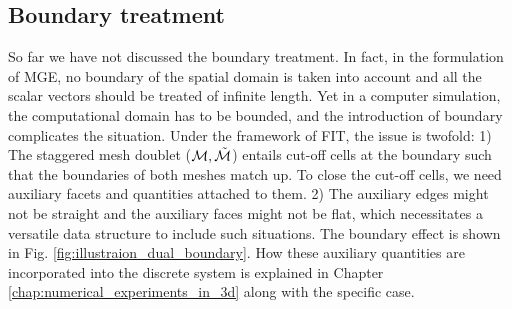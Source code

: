 \documentclass{report}
\begin{document}
\subsection{Boundary treatment} \label{sec:boundary_treatment}

So far we have not discussed the boundary treatment. In fact, in the formulation of MGE, no boundary of the spatial domain is taken into account and all the scalar vectors should be treated of infinite length. Yet in a computer simulation, the computational domain has to be bounded, and the introduction of boundary complicates the situation. Under the framework of FIT, the issue is twofold: 1) The staggered mesh doublet ($\mathcal{M}, \Tilde{\mathcal{M}}$) entails cut-off cells at the boundary such that the boundaries of both meshes match up. To close the cut-off cells, we need auxiliary facets and quantities attached to them. 2) The auxiliary edges might not be straight and the auxiliary faces might not be flat, which necessitates a versatile data structure to include such situations. The boundary effect is shown in Fig. \ref{fig:illustraion_dual_boundary}. How these auxiliary quantities are incorporated into the discrete system is explained in Chapter \ref{chap:numerical_experiments_in_3d} along with the specific case.
\end{document}
